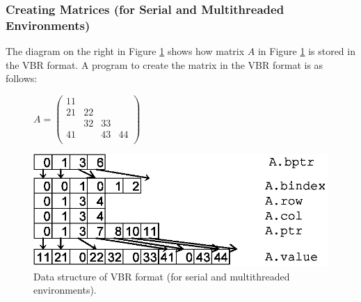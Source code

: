 \documentclass[a4paper]{article}
\begin{document}
\newpage
\subsubsection{Creating Matrices (for Serial and Multithreaded Environments)}
The diagram on the right in Figure \ref{fig:storage09} shows how matrix $A$ in Figure \ref{fig:storage09} is stored in the VBR format. A program to create the matrix in the VBR format is as follows:
\begin{figure}[h]
{\centering 
\begin{minipage}{0.3\textwidth}
\begin{flushright}
$ 
A = \left(
\begin{array}{c|cc|c}
11 &    &    &    \\ \hline
21 & 22 &    &    \\
   & 32 & 33 &    \\ \hline
41 &    & 43 & 44 \\
\end{array}\right)
$
\end{flushright}
\end{minipage}
\begin{minipage}{0.6\textwidth}
\begin{flushleft}
\includegraphics{storage09.eps} 
\end{flushleft}
\end{minipage}
\caption{Data structure of VBR format (for serial and multithreaded environments).}\label{fig:storage09}}
\end{figure}
\end{document}
